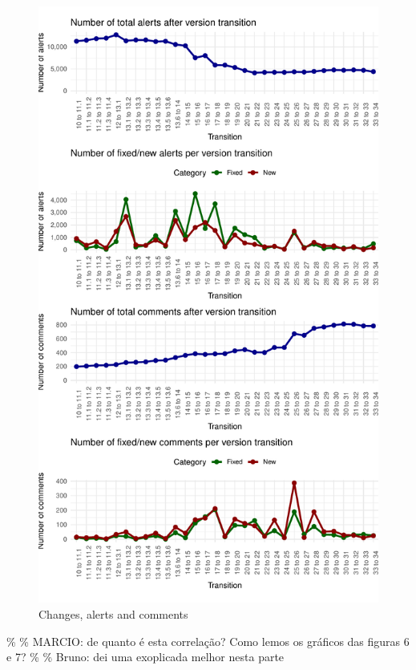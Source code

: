 \documentclass[
]{article}
\begin{document}
\begin{figure}
\centering
\includegraphics{report_files/figure-latex/unnamed-chunk-21-1.pdf}
\caption{\label{timeseries}Changes, alerts and comments}
\end{figure}

\normalsize

\newpage

\small

\normalsize

\% \% MARCIO: de quanto é esta correlação? Como lemos os gráficos das
figuras 6 e 7? \% \% Bruno: dei uma exoplicada melhor nesta parte
\end{document}
